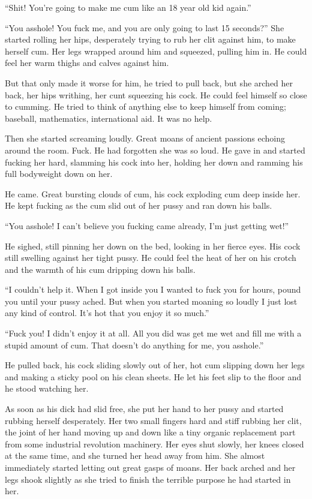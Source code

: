 \documentclass[letterpaper]{article}
\begin{document}
``Shit! You're going to make me cum like an 18 year old kid again.''

``You asshole! You fuck me, and you are only going to last 15 seconds?'' She started rolling her hips, desperately trying to rub her clit against him, to make herself cum. Her legs wrapped around him and squeezed, pulling him in. He could feel her warm thighs and calves against him.

But that only made it worse for him, he tried to pull back, but she arched her back, her hips writhing, her cunt squeezing his cock. He could feel himself so close to cumming.
He tried to think of anything else to keep himself from coming; baseball, mathematics, international aid. It was no help.

Then she started screaming loudly. Great moans of ancient passions echoing around the room. Fuck. He had forgotten she was so loud. He gave in and started fucking her hard, slamming his cock into her, holding her down and ramming his full bodyweight down on her.

He came. Great bursting clouds of cum, his cock exploding cum deep inside her. He kept fucking as the cum slid out of her pussy and ran down his balls.

``You asshole! I can't believe you fucking came already, I'm just getting wet!''

He sighed, still pinning her down on the bed, looking in her fierce eyes. His cock still swelling against her tight pussy. He could feel the heat of her on his crotch and the warmth of his cum dripping down his balls.

``I couldn't help it. When I got inside you I wanted to fuck you for hours, pound you until your pussy ached. But when you started moaning so loudly I just lost any kind of control. It's hot that you enjoy it so much.''

``Fuck you! I didn't enjoy it at all. All you did was get me wet and fill me with a stupid amount of cum. That doesn't do anything for me, you asshole.''

He pulled back, his cock sliding slowly out of her, hot cum slipping down her legs and making a sticky pool on his clean sheets. He let his feet slip to the floor and he stood watching her.

As soon as his dick had slid free, she put her hand to her pussy and started rubbing herself desperately. 
Her two small fingers hard and stiff rubbing her clit, the joint of her hand moving up and down like a tiny organic replacement part from some industrial revolution machinery.
Her eyes shut slowly, her knees closed at the same time, and she turned her head away from him.
She almost immediately started letting out great gasps of moans.
Her back arched and her legs shook slightly as she tried to finish the terrible purpose he had started in her.
\end{document}
